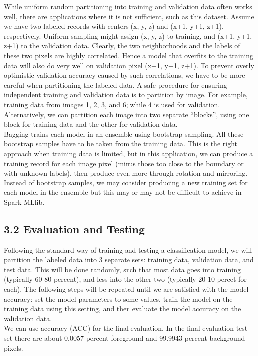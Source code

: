 \documentclass{neu_handout}
\begin{document}
While uniform random partitioning into training and validation data often works well, there are
applications where it is not sufficient, such as this dataset. Assume we have two labeled
records with centers (x, y, z) and (x+1, y+1, z+1), respectively. Uniform sampling might assign (x, y, z) to
training, and (x+1, y+1, z+1) to the validation data. Clearly, the two neighborhoods and the labels of
these two pixels are highly correlated. Hence a model that overfits to the training data will also do very
well on validation pixel (x+1, y+1, z+1). To prevent overly optimistic validation accuracy caused by such
correlations, we have to be more careful when partitioning the labeled data. A safe procedure for 
ensuring independent training and validation data is to partition by image. For example, training data from images 1, 2, 3, and 6; while 4 is used for validation. Alternatively, we can partition each
image into two separate “blocks”, using one block for training data and the other for validation data.\\

Bagging trains each model in an ensemble using bootstrap sampling. All these bootstrap samples have to be taken from the training data. This is the right approach when training data is limited, but in this application, we can produce a training record for each image pixel (minus those too close to the boundary or with unknown labels), then produce even more through rotation and mirroring. Instead of bootstrap samples, we may consider producing a new training set for each model in the ensemble but this may or may not be difficult to achieve in Spark MLlib.

\subsection*{3.2 Evaluation and Testing}
Following the standard way of training and testing a classification model, we will partition the labeled data into 3 separate sets: training data, validation data, and test data. This will be done randomly, such that most data goes into training (typically 60-80 percent), and less into the other two (typically 20-10 percet for each). The following steps will be repeated until we are satisfied with the model accuracy: set the model parameters to some values, train the model on the training data using this setting, and then evaluate the model accuracy on the validation data.\\

We can use accuracy (ACC) for the final evaluation. In the final evaluation test set there are about 0.0057 percent foreground and 99.9943 percent background pixels.\\
\end{document}
